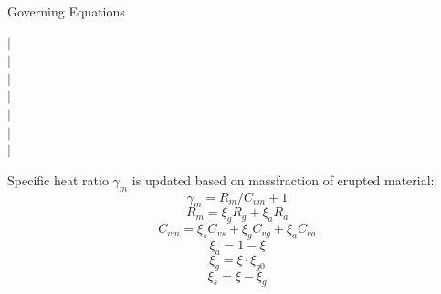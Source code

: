 \documentclass{beamer}
\begin{document}
\begin{frame}{Governing Equations}
\begin{minipage}{.01\textwidth}
$\vert$\\
$\vert$\\
$\vert$\\
$\vert$\\
$\vert$\\
$\vert$\\
$\vert$\\
\end{minipage}
\begin{minipage}{.46\textwidth}
Specific heat ratio $\gamma_m$ is updated based on massfraction of erupted material:
\begin{equation}
\gamma_m = R_m/C_{vm} + 1 \label{eq:gov-gm}
\end{equation}
\begin{equation}
R_m = \xi_g R_g + \xi_a R_a  \label{eq:gov-Rm}
\end{equation}
\begin{equation}
C_{vm} = \xi_s C_{vs} + \xi_g C_{vg} + \xi_a C_{va} \label{eq:gov-Cvm}
\end{equation}
\begin{equation}
\xi_a = 1 - \xi \label{eq:gov-na}
\end{equation}
\begin{equation}
\xi_g = \xi \cdot \xi_{g0} \label{eq:gov-ng}
\end{equation}
\begin{equation}
\xi_s = \xi - \xi_g \label{eq:gov-ns}
\end{equation}
\end{minipage}
%
\end{frame}
%
\end{document}
